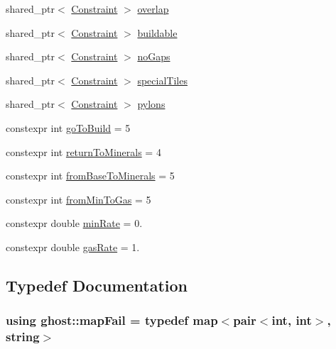 \begin{DoxyCompactItemize}
\item 
shared\-\_\-ptr$<$ \hyperlink{classghost_1_1Constraint}{Constraint} $>$ \hyperlink{namespaceghost_a7a91cd37137a7eae220126fcbb8ff96b}{overlap}
\item 
shared\-\_\-ptr$<$ \hyperlink{classghost_1_1Constraint}{Constraint} $>$ \hyperlink{namespaceghost_aed6c0dcd76842d41ca1a81a6b4301247}{buildable}
\item 
shared\-\_\-ptr$<$ \hyperlink{classghost_1_1Constraint}{Constraint} $>$ \hyperlink{namespaceghost_a4b6df9d0b61991e356eb28353a73be30}{no\-Gaps}
\item 
shared\-\_\-ptr$<$ \hyperlink{classghost_1_1Constraint}{Constraint} $>$ \hyperlink{namespaceghost_a41140633099e7f2158ce39ca3a469abb}{special\-Tiles}
\item 
shared\-\_\-ptr$<$ \hyperlink{classghost_1_1Constraint}{Constraint} $>$ \hyperlink{namespaceghost_a381584b094da85f582a9b24eedf21411}{pylons}
\item 
constexpr int \hyperlink{namespaceghost_a6281c7426908c18212d4d10b999e40bc}{go\-To\-Build} = 5
\item 
constexpr int \hyperlink{namespaceghost_ada242341970bc16ae93c8343d092b9d1}{return\-To\-Minerals} = 4
\item 
constexpr int \hyperlink{namespaceghost_aef53554d2400a44d3f13b5d10da5dc60}{from\-Base\-To\-Minerals} = 5
\item 
constexpr int \hyperlink{namespaceghost_a1accff79c78b223ee8400747204dd3b2}{from\-Min\-To\-Gas} = 5
\item 
constexpr double \hyperlink{namespaceghost_a093a7f8d4ed6ac0ed8e51ffb3f61d3b3}{min\-Rate} = 0.
\item 
constexpr double \hyperlink{namespaceghost_a080e7a4629484df50f3c1fa938a80181}{gas\-Rate} = 1.
\end{DoxyCompactItemize}


\subsection{Typedef Documentation}
\hypertarget{namespaceghost_af44c393431f46e255b1c303cd50854b8}{
\subsubsection[{map\-Fail}]{\setlength{\rightskip}{0pt plus 5cm}using {\bf ghost\-::map\-Fail} = typedef map$<$pair$<$int, int$>$, string$>$}}\label{namespaceghost_af44c393431f46e255b1c303cd50854b8}


